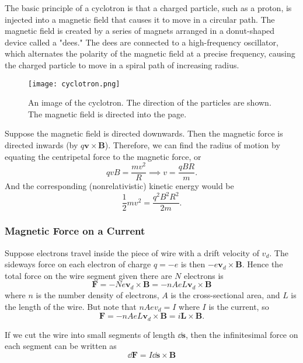 \documentclass[12pt]{article}
\let\vec\mathbf
\begin{document}
The basic principle of a cyclotron is that a charged particle, such as a proton, is injected into a magnetic field that causes it to move in a circular path. The magnetic field is created by a series of magnets arranged in a donut-shaped device called a "dees." The dees are connected to a high-frequency oscillator, which alternates the polarity of the magnetic field at a precise frequency, causing the charged particle to move in a spiral path of increasing radius.
  \begin{figure}[H]
  \centering
      \texttt{[image: cyclotron.png]}
      \caption{An image of the cyclotron. The direction of the particles are shown. The magnetic field is directed into the page.}
  \end{figure}
Suppose the magnetic field is directed downwards. Then the magnetic force is directed inwards (by $q\vec v \times \vec B$). Therefore, we can find the radius of motion by equating the centripetal force to the magnetic force, or 
\[qvB = \frac{mv^2}{R}\implies v = \frac{qBR}{m}. \]
And the corresponding (nonrelativistic) kinetic energy would be 
\[\frac{1}{2}mv^2 = \frac{q^2 B^2 R^2}{2m}.\]
\subsubsection{Magnetic Force on a Current}
Suppose electrons travel inside the piece of wire with a drift velocity of $v_d$. The sideways force on each electron of charge $q = -e$ is then $-e\vec v_d \times \vec B.$ Hence the total force on the wire segment given there are $N$ electrons is 
\[\vec F = -Ne\vec v_d \times \vec B = -nAeL \vec v_d\times \vec B\]
where $n$ is the number density of electrons, $A$ is the cross-sectional area, and $L$ is the length of the wire. But note that $nAev_d = I$ where $I$ is the current, so 
\[\vec F = -nAeL \vec v_d \times \vec B = i\vec L \times \vec B.\]
\begin{idea}
If we cut the wire into small segments of length $\dd \vec s$, then the infinitesimal force on each segment can be written as 
\[\dd \vec F = I \dd \vec s \times \vec B\]
\end{idea}
\end{document}
